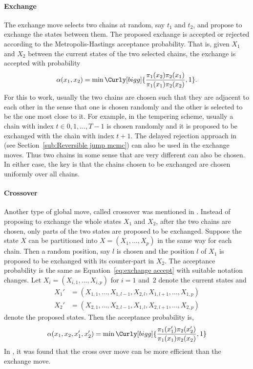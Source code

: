 

\paragraph{Exchange}

The exchange move selects two chains at random, say $t_1$ and $t_2$, and
propose to exchange the states between them. The proposed exchange is accepted
or rejected according to the Metropolis-Hastings acceptance probability. That
is, given $X_1$ and $X_2$ between the current states of the two selected
chains, the exchange is accepted with probability
\begin{equation}
  \alpha(x_1, x_2) =
  \min\Curly[bigg]{\frac{\pi_1(x_2)\pi_2(x_1)}{\pi_1(x_1)\pi_2(x_2)}, 1}.
  \label{eq:exchange accept}
\end{equation}
For this to work, usually the two chains are chosen such that they are
adjacent to each other in the sense that one is chosen randomly and the other
is selected to be the one most close to it. For example, in the tempering
scheme, usually a chain with index $t\in{0,1,\dots,T-1}$ is chosen randomly
and it is proposed to be exchanged with the chain with index $t+1$. The
delayed rejection approach in \cite{Green:2001tk} (see
Section~\ref{sub:Reversible jump mcmc}) can also be used in the exchange
moves. Thus two chains in some sense that are very different can also be
chosen. In either case, the key is that the chains chosen to be exchanged are
chosen uniformly over all chains.

\paragraph{Crossover}

Another type of global move, called crossover was mentioned in
\cite{Liang:2001dc}. Instead of proposing to exchange the whole states $X_1$
and $X_2$, after the two chains are chosen, only parts of the two states are
proposed to be exchanged. Suppose the state $X$ can be partitioned into $X =
(X_1,\dots,X_p)$ in the same way for each chain. Then a random position, say
$l$ is chosen and the position $l$ of $X_1$ is proposed to be exchanged with
its counter-part in $X_2$. The acceptance probability is the same as
Equation~\eqref{eq:exchange accept} with suitable notation changes. Let
$X_i = (X_{i,1},\dots,X_{i,p})$ for $i = 1$ and~$2$ denote the current
states and
\begin{align*}
  X_1' &= (X_{1,1},\dots,X_{1,l-1},X_{2,l},X_{1,l+1},\dots,X_{1,p}) \\
  X_2' &= (X_{2,1},\dots,X_{2,l-1},X_{1,l},X_{2,l+1},\dots,X_{2,p})
\end{align*}
denote the proposed states. Then the acceptance probability is,
\begin{equation}
  \alpha(x_1,x_2,x_1',x_2') = \min\Curly[bigg]
  {\frac{\pi_1(x_1')\pi_2(x_2')}{\pi_1(x_1)\pi_2(x_2)},1}
\end{equation}
In \cite{Jasra:2007in}, it was found that the cross over move can be more
efficient than the exchange move.

